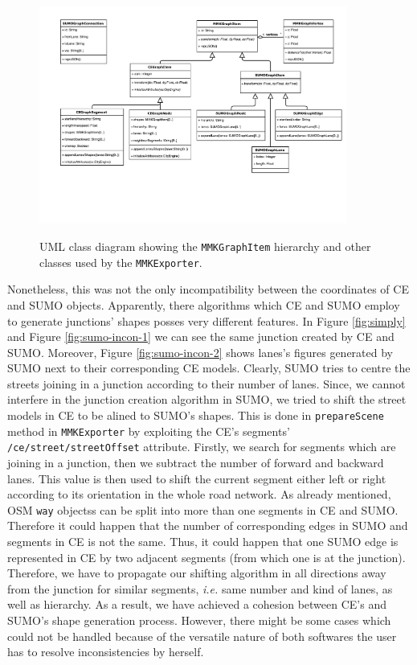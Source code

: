 \begin{figure}[htb]
	\centering
	\includegraphics[width=0.9\textwidth]{figures/ce-uml}
	\label{fig:ce-uml}
	\caption{UML class diagram showing the \texttt{MMKGraphItem} hierarchy and other classes used by the \texttt{MMKExporter}.}
\end{figure}

Nonetheless, this was not the only incompatibility between the coordinates of CE and SUMO objects. Apparently, there algorithms which CE and SUMO employ to generate junctions' shapes posses very different features. In Figure \ref{fig:simply} and Figure \ref{fig:sumo-incon-1} we can see the same junction created by CE and SUMO. Moreover, Figure \ref{fig:sumo-incon-2} shows lanes's figures generated by SUMO next to their corresponding CE models. Clearly, SUMO tries to centre the streets joining in a junction according to their number of lanes. Since, we cannot interfere in the junction creation algorithm in SUMO, we tried to shift the street models in CE to be alined to SUMO's shapes. This is done in \texttt{prepareScene} method in \texttt{MMKExporter} by exploiting the CE's segments' \texttt{/ce/street/streetOffset} attribute. Firstly, we search for segments which are joining in a junction, then we subtract the number of forward and backward lanes. This value is then used to shift the current segment either left or right according to its orientation in the whole road network. As already mentioned, OSM \texttt{way} objectss can be split into more than one segments in CE and SUMO. Therefore it could happen that the number of corresponding edges in SUMO and segments in CE is not the same. Thus, it could happen that one SUMO edge is represented in CE by two adjacent segments (from which one is at the junction). Therefore, we have to propagate our shifting algorithm in all directions away from the junction for similar segments, \emph{i.e.} same number and kind of lanes, as well as hierarchy. As a result, we have achieved a cohesion between CE's and SUMO's shape generation process. However, there might be some cases which could not be handled because of the versatile nature of both softwares the user has to resolve inconsistencies by herself.\\

